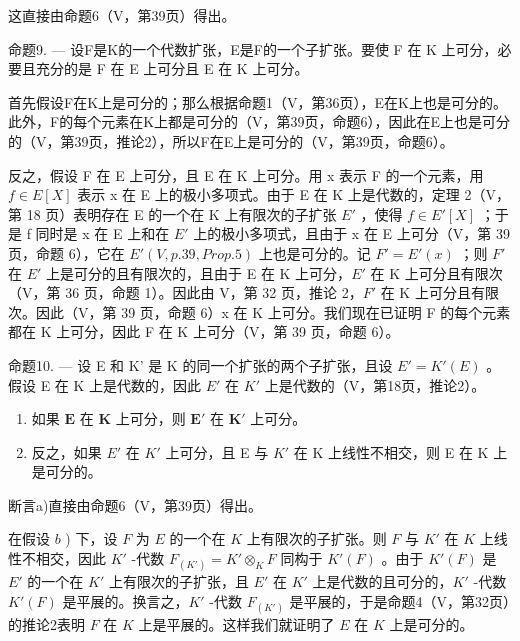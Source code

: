 这直接由命题6（V，第39页）得出。

命题9. --- 设F是K的一个代数扩张，E是F的一个子扩张。要使 F 在 K 上可分，必要且充分的是 F 在 E 上可分且 E 在 K 上可分。

首先假设F在K上是可分的；那么根据命题1（V，第36页），E在K上也是可分的。此外，F的每个元素在K上都是可分的（V，第39页，命题6），因此在E上也是可分的（V，第39页，推论2），所以F在E上是可分的（V，第39页，命题6）。

反之，假设 F 在 E 上可分，且 E 在 K 上可分。用 x 表示 F 的一个元素，用 \(f \in E[X]\) 表示 x 在 E 上的极小多项式。由于 E 在 K 上是代数的，定理 2（V，第 18 页）表明存在 E 的一个在 K 上有限次的子扩张 \(E'\) ，使得 \(f \in E'[X]\) ；于是 f 同时是 x 在 E 上和在 \(E'\) 上的极小多项式，且由于 x 在 E 上可分（V，第 39 页，命题 6），它在 \(E'(V, p. 39, Prop. 5)\) 上也是可分的。记 \(F' = E'(x)\) ；则 \(F'\) 在 \(E'\) 上是可分的且有限次的，且由于 E 在 K 上可分，\(E'\) 在 K 上可分且有限次（V，第 36 页，命题 1）。因此由 V，第 32 页，推论 2，\(F'\) 在 K 上可分且有限次。因此（V，第 39 页，命题 6）x 在 K 上可分。我们现在已证明 F 的每个元素都在 K 上可分，因此 F 在 K 上可分（V，第 39 页，命题 6）。

命题10. --- 设 E 和 K' 是 K 的同一个扩张的两个子扩张，且设 \(E' = K'(E)\) 。假设 E 在 K 上是代数的，因此 \(E'\) 在 \(K'\) 上是代数的（V，第18页，推论2）。

\begin{enumerate}
\def\labelenumi{\alph{enumi})}
\item
  如果 \(\mathbf{E}\) 在 \(\mathbf{K}\) 上可分，则 \(\mathbf{E}'\) 在 \(\mathbf{K}'\) 上可分。
\item
  反之，如果 \(E'\) 在 \(K'\) 上可分，且 E 与 \(K'\) 在 K 上线性不相交，则 E 在 K 上是可分的。
\end{enumerate}

断言a)直接由命题6（V，第39页）得出。

在假设 \(b\) ) 下，设 \(F\) 为 \(E\) 的一个在 \(K\) 上有限次的子扩张。则 \(F\) 与 \(K'\) 在 \(K\) 上线性不相交，因此 \(K'\) -代数 \(F_{(K')} = K' \otimes_K F\) 同构于 \(K'(F)\) 。由于 \(K'(F)\) 是 \(E'\) 的一个在 \(K'\) 上有限次的子扩张，且 \(E'\) 在 \(K'\) 上是代数的且可分的，\(K'\) -代数 \(K'(F)\) 是平展的。换言之，\(K'\) -代数 \(F_{(K')}\) 是平展的，于是命题4（V，第32页）的推论2表明 \(F\) 在 \(K\) 上是平展的。这样我们就证明了 \(E\) 在 \(K\) 上是可分的。
